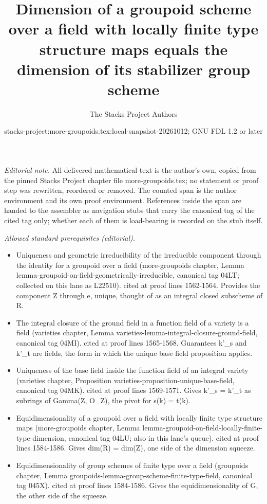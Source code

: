 \documentclass{stacks-project}
\title{Dimension of a groupoid scheme over a field with locally finite type structure maps equals the dimension of its stabilizer group scheme}
\author{The Stacks Project Authors}
\date{stacks-project:more-groupoids.tex:local-snapshot-20261012; GNU FDL 1.2 or later}
\theoremstyle{plain}
\theoremstyle{definition}
\theoremstyle{remark}
\numberwithin{equation}{subsection}
\begin{document}
\maketitle
\setcounter{subsection}{1}
\noindent\textit{Editorial note.} All delivered mathematical text is the author's own, copied from the pinned Stacks Project chapter file more-groupoids.tex; no statement or proof step was rewritten, reordered or removed. The counted span is the author environment and its own proof environment. References inside the span are handed to the assembler as navigation stubs that carry the canonical tag of the cited tag only; whether each of them is load-bearing is recorded on the stub itself.\par\medskip
\noindent\textit{Allowed standard prerequisites (editorial).}\begin{itemize}
\item Uniqueness and geometric irreducibility of the irreducible component through the identity for a groupoid over a field (more-groupoids chapter, Lemma lemma-groupoid-on-field-geometrically-irreducible, canonical tag 04LT; collected on this lane as L22510). cited at proof lines 1562-1564. Provides the component Z through e, unique, thought of as an integral closed subscheme of R.
\item The integral closure of the ground field in a function field of a variety is a field (varieties chapter, Lemma varieties-lemma-integral-closure-ground-field, canonical tag 04MI). cited at proof lines 1565-1568. Guarantees k'\_s and k'\_t are fields, the form in which the unique base field proposition applies.
\item Uniqueness of the base field inside the function field of an integral variety (varieties chapter, Proposition varieties-proposition-unique-base-field, canonical tag 04MK). cited at proof lines 1569-1571. Gives k'\_s = k'\_t as subrings of Gamma(Z, O\_Z), the pivot for s(k) = t(k).
\item Equidimensionality of a groupoid over a field with locally finite type structure maps (more-groupoids chapter, Lemma lemma-groupoid-on-field-locally-finite-type-dimension, canonical tag 04LU; also in this lane's queue). cited at proof lines 1584-1586. Gives dim(R) = dim(Z), one side of the dimension squeeze.
\item Equidimensionality of group schemes of finite type over a field (groupoids chapter, Lemma groupoids-lemma-group-scheme-finite-type-field, canonical tag 045X). cited at proof lines 1584-1586. Gives the equidimensionality of G, the other side of the squeeze.
\end{itemize}\medskip
\end{document}
